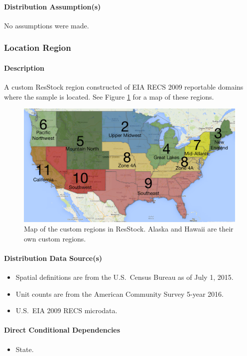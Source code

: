 \paragraph{Distribution Assumption(s)}
No assumptions were made.

\subsubsection{Location Region}
\paragraph{Description}
A custom ResStock region constructed of EIA RECS 2009 reportable domains where the sample is located. See Figure \ref{fig:location_region_map} for a map of these regions.

\begin{figure}
    \centering
    \includegraphics[width=1\linewidth]{images/custom_region_map.png}
    \caption{ Map of the custom regions in ResStock. Alaska and Hawaii are their own custom regions.}
    \label{fig:location_region_map}
\end{figure}


\paragraph{Distribution Data Source(s)}
\begin{itemize}
    \item Spatial definitions are from the U.S.~Census Bureau as of July 1, 2015.
    \item Unit counts are from the American Community Survey 5-year 2016.
    \item U.S.~EIA 2009 RECS microdata.
\end{itemize}

\paragraph{Direct Conditional Dependencies}
\begin{itemize}
    \item State.
\end{itemize}


